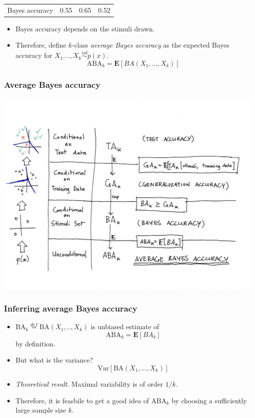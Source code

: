\documentclass{beamer}
\newcommand{\E}{\textbf{E}}
\begin{document}
\begin{frame}
\begin{center}
\begin{tabular}{c|c|c|c}
Bayes accuracy & 0.55 & 0.65 & 0.52 \\
\end{tabular}
\end{center}
\begin{itemize}
\item Bayes accuracy depends on the stimuli drawn.
\item Therefore, define $k$-class \emph{average Bayes accuracy} as the expected Bayes accuracy for $X_1,..,X_k \stackrel{iid}{\sim} p(x)$.
\[
\text{ABA}_k = \E[BA(X_1,...,X_k)]
\]
\end{itemize}
\end{frame}

\begin{frame}
\frametitle{Average Bayes accuracy}
\includegraphics[scale = 0.45, clip = true, trim = 0in 1in 0.5in 1in]{ta_to_aba.png}
\end{frame}

\begin{frame}
\frametitle{Inferring average Bayes accuracy}

\begin{itemize}
\item $\text{BA}_k \stackrel{def}{=} \text{BA}(X_1,..,X_k)$ is unbiased estimate of
\[
\text{ABA}_k = \E[BA_k]
\]
by definition.
\item But what is the variance?
\[
\text{Var}[\text{BA}(X_1,...,X_k)]
\]
\item \emph{Theoretical result}. Maximal variability is of order $1/k$.
\item Therefore, it is feasbile to get a good idea of $\text{ABA}_k$ by choosing a sufficiently large sample size $k$.
\end{itemize}
\end{frame}
\end{document}
